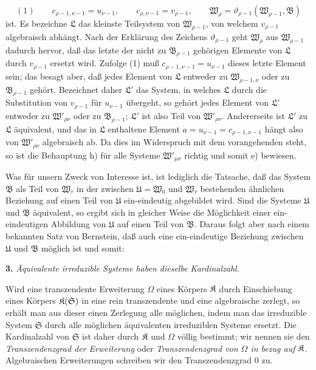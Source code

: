 \[
(1)\qquad c_{\rho-1,\nu-1}=u_{\nu-1},\qquad
c_{\rho,\nu-1}=v_{\rho-1},
\qquad
\mathfrak W_\rho=\vartheta_{\rho-1}(\mathfrak W_{\rho-1},\mathfrak B)
\]
ist. Es bezeichne \(\mathfrak L\) das kleinste Teilsystem von \(\mathfrak W_{\rho-1}\), von welchem \(v_{\rho-1}\) algebraisch abhängt. Nach der Erklärung des Zeichens \(\vartheta_{\rho-1}\) geht \(\mathfrak W_\rho\) aus \(\mathfrak W_{\rho-1}\) dadurch hervor, daß das letzte der nicht zu \(\mathfrak B_{\rho-1}\) gehörigen Elemente von \(\mathfrak L\) durch \(v_{\rho-1}\) ersetzt wird. Zufolge (1) muß \(c_{\rho-1,\nu-1}=u_{\nu-1}\) dieses letzte Element sein; das besagt aber, daß jedes Element von \(\mathfrak L\) entweder zu \(\mathfrak W_{\rho-1,\nu}\) oder zu \(\mathfrak B_{\rho-1}\) gehört. Bezeichnet daher \(\mathfrak L'\) das System, in welches \(\mathfrak L\) durch die Substitution von \(v_{\rho-1}\) für \(u_{\nu-1}\) übergeht, so gehört jedes Element von \(\mathfrak L'\) entweder zu \(\mathfrak W'_{\rho\nu}\) oder zu \(\mathfrak B_{\rho-1}\); \(\mathfrak L'\) ist also Teil von \(\mathfrak W'_{\rho\nu}\). Andererseits ist \(\mathfrak L'\) zu \(\mathfrak L\) äquivalent, und das in \(\mathfrak L\) enthaltene Element \(a=u_{\nu-1}=c_{\rho-1,\nu-1}\) hängt also von \(\mathfrak W'_{\rho\nu}\) algebraisch ab. Da dies im Widerspruch mit dem vorangehenden steht, so ist die Behauptung h) für alle Systeme \(\mathfrak W'_{\mu\nu}\) richtig und somit e) bewiesen.

Was für unsern Zweck von Interesse ist, ist lediglich die Tatsache, daß das System \(\mathfrak B\) als Teil von \(\mathfrak W_\tau\) in der zwischen \(\mathfrak U=\mathfrak W_0\) und \(\mathfrak W_\tau\) bestehenden ähnlichen Beziehung auf einen Teil von \(\mathfrak U\) ein-eindeutig abgebildet wird. Sind die Systeme \(\mathfrak U\) und \(\mathfrak B\) äquivalent, so ergibt sich in gleicher Weise die Möglichkeit einer ein-eindeutigen Abbildung von \(\mathfrak U\) auf einen Teil von \(\mathfrak B\). Daraus folgt aber nach einem bekannten Satz von Bernstein, daß auch eine ein-eindeutige Beziehung zwischen \(\mathfrak U\) und \(\mathfrak B\) möglich ist und somit:

\textbf{3.} \emph{Äquivalente irreduzible Systeme haben dieselbe Kardinalzahl.}

Wird eine transzendente Erweiterung \(\Omega\) eines Körpers \(\mathfrak K\) durch Einschiebung eines Körpers \(\mathfrak K(\mathfrak S)\) in eine rein transzendente und eine algebraische zerlegt, so erhält man aus dieser einen Zerlegung alle möglichen, indem man das irreduzible System \(\mathfrak S\) durch alle möglichen äquivalenten irreduziblen Systeme ersetzt. Die Kardinalzahl von \(\mathfrak S\) ist daher durch \(\mathfrak K\) und \(\Omega\) völlig bestimmt; wir nennen sie den \emph{Transzendenzgrad der Erweiterung} oder \emph{Transzendenzgrad von \(\Omega\) in bezug auf \(\mathfrak K\)}. Algebraischen Erweiterungen schreiben wir den Transzendenzgrad 0 zu.

